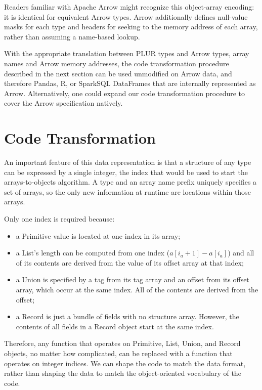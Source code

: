 \documentclass[10pt, conference, compsocconf]{IEEEtran}
\begin{document}
Readers familiar with Apache Arrow might recognize this object-array encoding\cite{arrow-layout}: it is identical for equivalent Arrow types. Arrow additionally defines null-value masks for each type and headers for seeking to the memory address of each array, rather than assuming a name-based lookup.

With the appropriate translation between PLUR types and Arrow types, array names and Arrow memory addresses, the code transformation procedure described in the next section can be used unmodified on Arrow data, and therefore Pandas\cite{pandas}, R\cite{R}, or SparkSQL\cite{sparksql} DataFrames that are internally represented as Arrow. Alternatively, one could expand our code transformation procedure to cover the Arrow specification natively.

\section{Code Transformation}

An important feature of this data representation is that a structure of any type can be expressed by a single integer, the index that would be used to start the arrays-to-objects algorithm. A type and an array name prefix uniquely specifies a set of arrays, so the only new information at runtime are locations within those arrays.

Only one index is required because:
\begin{itemize}
\item a Primitive value is located at one index in its array;
\item a List's length can be computed from one index \mbox{($a[i_a + 1] - a[i_a]$)} and all of its contents are derived from the value of its offset array at that index;
\item a Union is specified by a tag from its tag array and an offset from its offset array, which occur at the same index. All of the contents are derived from the offset;
\item a Record is just a bundle of fields with no structure array. However, the contents of all fields in a Record object start at the same index.
\end{itemize}

Therefore, any function that operates on Primitive, List, Union, and Record objects, no matter how complicated, can be replaced with a function that operates on integer indices. We can shape the code to match the data format, rather than shaping the data to match the object-oriented vocabulary of the code.
\end{document}
